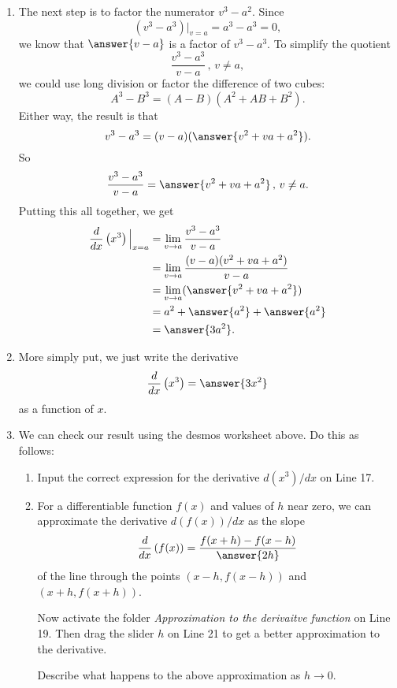\documentclass{ximera}
\begin{document}
\begin{exploration}
\begin{enumerate}
\item The next step is to factor the numerator $v^3-a^2$. Since 
\[
     (v^3 - a^3)\Big|_{v=a} = a^3 - a^3 = 0 ,
\]
we know that $\answer{v-a}$ is a factor of $v^3-a^3$. To simplify the quotient
\[
  \frac{v^3-a^3}{v-a} \, , \, v\neq a,
\]
we could use long division or factor the difference of two cubes:
\[
   A^3 - B^3 = (A-B)(A^2 + AB + B^2).
\]
Either way, the result is that
\[
     v^3 - a^3 = (v-a)(\answer{v^2 + va + a^2}).
\]
So
\[
   \frac{v^3-a^3}{v-a} = \answer{v^2+va+a^2} \, , \, v\neq a.
\]
Putting this all together, we get
\begin{align*}
\frac{d}{dx}\left( x^3 \right)\Big|_{x=a}  & = \lim_{v\to a} \frac{v^3-a^3}{v-a} \\
                                                              &= \lim_{v\to a} \frac{(v-a)(v^2+va+a^2)}{v-a} \\
                                                             & = \lim_{v\to a}(\answer{v^2 + va + a^2}) \\
                                                            & = a^2 + \answer{a^2} + \answer{a^2} \\
                                                            & = \answer{3a^2} .
\end{align*}

\item More simply put, we just write the derivative
\[
   \frac{d}{dx}\left( x^3  \right) = \answer{3x^2}
\]
as a function of $x$.

\item We can check our result using the desmos worksheet above. Do this as follows:

\begin{enumerate}

\item Input the correct expression for the derivative $d(x^3)/dx$ on Line 17.

\item For a differentiable function $f(x)$ and values of $h$ near zero, we can approximate the derivative $d(f(x))/dx$ as the slope
\[
  \frac{d}{dx}\left( f(x)  \right) = \frac{f(x+h) - f(x-h)}{\answer{2h}}
\]
of the line through the points $(x-h, f(x-h))$ and $(x+h, f(x+h))$.

Now activate the folder \emph{Approximation to the derivaitve function} on Line 19. Then drag the slider $h$ on Line 21 to get a better approximation to the derivative.

\begin{freeResponse}
Describe what happens to the above approximation as $h \to 0$.
\end{freeResponse}

\end{enumerate}
\end{enumerate}
\end{exploration}
\end{document}
